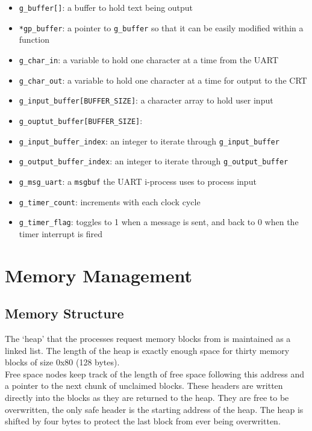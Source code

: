 \documentclass[12pt]{report}
\begin{document}
\begin{itemize}
	\item \texttt{g\_buffer[]}: a buffer to hold text being output
	\item \texttt{*gp\_buffer}: a pointer to \texttt{g\_buffer} so that it can be easily modified within a function
	\item \texttt{g\_char\_in}: a variable to hold one character at a time from the UART
	\item \texttt{g\_char\_out}: a variable to hold one character at a time for output to the CRT
	\item \texttt{g\_input\_buffer[BUFFER\_SIZE]}: a character array to hold user input
	\item \texttt{g\_ouptut\_buffer[BUFFER\_SIZE]}:
	\item \texttt{g\_input\_buffer\_index}: an integer to iterate through \texttt{g\_input\_buffer}
	\item \texttt{g\_output\_buffer\_index}: an integer to iterate through \texttt{g\_output\_buffer}
	\item \texttt{g\_msg\_uart}: a \texttt{msgbuf} the UART i-process uses to process input
	\item \texttt{g\_timer\_count}: increments with each clock cycle
	\item \texttt{g\_timer\_flag}: toggles to 1 when a message is sent, and back to 0 when the timer interrupt is fired
\end{itemize}

\section{Memory Management}

\subsection{Memory Structure}

The `heap' that the processes request memory blocks from is maintained as a linked list. The length of the heap is exactly enough space for thirty memory blocks of size 0x80 (128 bytes).\\

Free space nodes keep track of the length of free space following this address and a pointer to the next chunk of unclaimed blocks. These headers are written directly into the blocks as they are returned to the heap. They are free to be overwritten, the only safe header is the starting address of the heap. The heap is shifted by four bytes to protect the last block from ever being overwritten. \\
\end{document}
